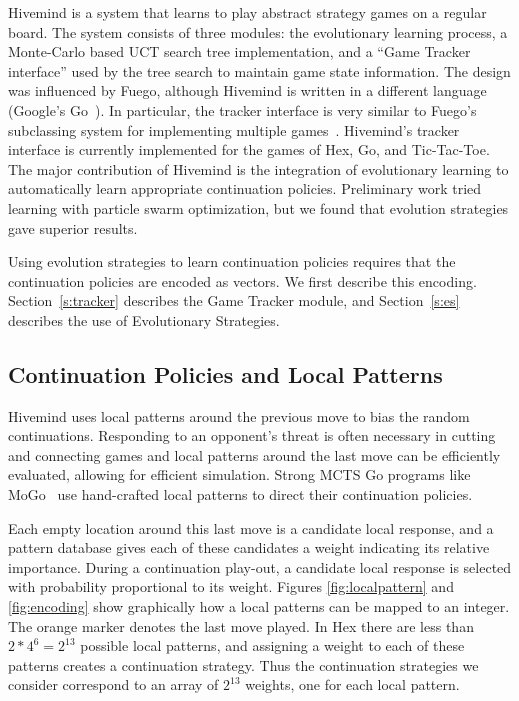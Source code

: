 \documentclass{acm_proc_article-sp}
\begin{document}
Hivemind is a system that learns to play abstract strategy games on a regular board. 
The system consists of three modules: the evolutionary learning process, a Monte-Carlo based UCT search tree implementation, and a ``Game Tracker interface'' used by the tree search to maintain game state information. 
The design was influenced by Fuego, although Hivemind is written in a different language (Google's Go~\cite{golang}). 
In particular, the tracker interface is very similar to Fuego's subclassing system for implementing multiple games~\cite{Fuego}. 
Hivemind's tracker interface is currently implemented for the games of Hex, Go, and Tic-Tac-Toe. 
The major contribution of Hivemind is the integration of evolutionary learning to automatically learn appropriate continuation policies.
Preliminary work tried learning with particle swarm optimization, but we found that evolution strategies gave
superior results.

Using evolution strategies to learn continuation policies requires that the continuation policies are encoded as vectors.
We first describe this encoding.  Section~\ref{s:tracker} describes the Game Tracker module, and Section~\ref{s:es} describes the
use of Evolutionary Strategies.

\subsection{Continuation Policies and Local Patterns}
\label{s:policies}

Hivemind uses local patterns around the previous move to bias the random continuations.
Responding to an opponent's threat is often necessary in cutting and connecting games
and local patterns around the last move can be efficiently evaluated, allowing for efficient simulation.
Strong MCTS Go programs like MoGo~\cite{gelly2006modification} use hand-crafted local patterns to direct their  continuation policies.

Each empty location around this last move is a candidate local response, and a pattern database gives each of these candidates a
weight indicating its relative importance.
During a continuation play-out, a candidate local response is selected with probability proportional to its weight.
Figures \ref{fig:localpattern} and \ref{fig:encoding} show graphically how a local patterns can be mapped to an integer. 
The orange marker denotes the last move played. 
In Hex there are less than $2 * 4^6=2^{13}$ possible local patterns, and 
assigning a weight to each of these patterns creates a continuation strategy.
Thus the continuation strategies we consider correspond to an array of $2^{13}$ weights, one for each local pattern.
\end{document}
